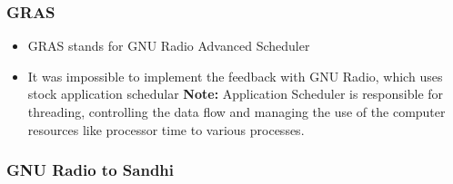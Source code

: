 \documentclass{beamer}
\begin{document}
\begin{frame}
        \frametitle{GRAS}
        \begin{itemize}
		\item GRAS stands for GNU Radio Advanced Scheduler
		\item It was impossible to implement the feedback with GNU Radio, which uses stock application schedular 
\textbf{Note:} Application Scheduler is responsible for threading, controlling the data flow and managing the use of the computer resources like processor time to various processes.
        \end{itemize}
\end{frame}



\begin{frame}
        \frametitle{GNU Radio to Sandhi}
        \begin{itemize}
        \end{itemize}
\end{frame}
\end{document}
